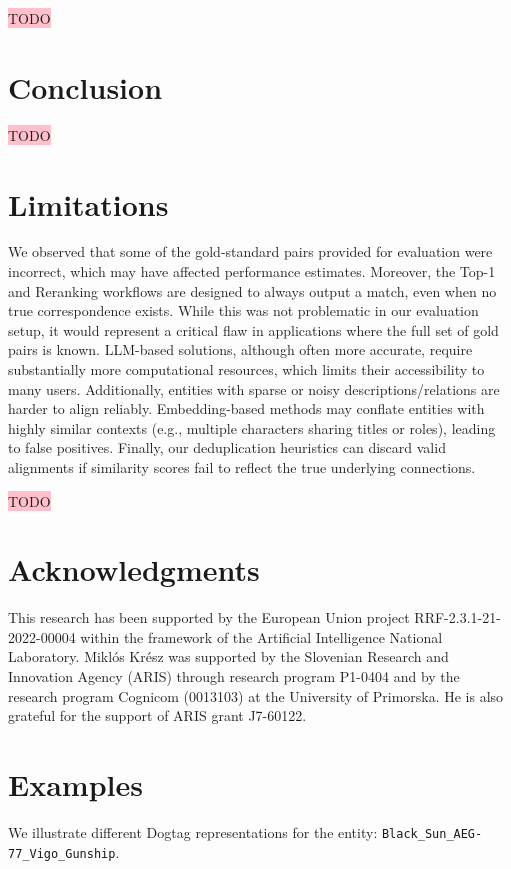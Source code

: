 \documentclass[11pt]{article}
\begin{document}
\colorbox{pink}{TODO}

\section*{Conclusion}

\colorbox{pink}{TODO}

\section*{Limitations}
We observed that some of the gold-standard pairs provided for evaluation were incorrect, which may have affected performance estimates. Moreover, the Top-1 and Reranking workflows are designed to always output a match, even when no true correspondence exists. While this was not problematic in our evaluation setup, it would represent a critical flaw in applications where the full set of gold pairs is known. LLM-based solutions, although often more accurate, require substantially more computational resources, which limits their accessibility to many users. 
Additionally, entities with sparse or noisy descriptions/relations are harder to align reliably. Embedding-based methods may conflate entities with highly similar contexts (e.g., multiple characters sharing titles or roles), leading to false positives. Finally, our deduplication heuristics can discard valid alignments if similarity scores fail to reflect the true underlying connections.

\colorbox{pink}{TODO}

\section*{Acknowledgments}
This research has been supported by the European Union project RRF-2.3.1-21-2022-00004 within the framework of the Artificial Intelligence National Laboratory. Miklós Krész was supported by the Slovenian Research and Innovation Agency (ARIS) through research program P1-0404 and by the research program Cognicom (0013103) at the University of Primorska. He is also grateful for the support of ARIS grant J7-60122.



\appendix

\section{Examples}
\label{sec:examples}

We illustrate different Dogtag representations for the entity:
\texttt{Black\_Sun\_AEG-77\_Vigo\_Gunship}.  
\end{document}
